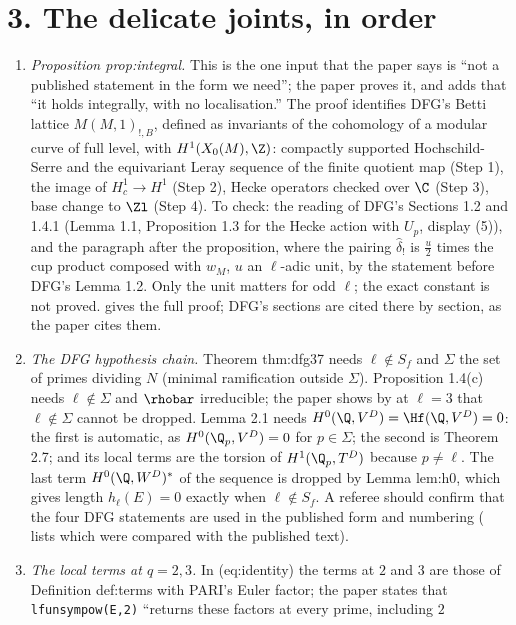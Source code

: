 \section*{3. The delicate joints, in order}

\begin{enumerate}[label=(\alph*), leftmargin=*]
\item \emph{Proposition prop:integral.} This is the one input that the paper says is ``not a published statement in the
form we need''; the paper proves it, and adds that ``it holds integrally, with no localisation.'' The proof identifies
DFG's Betti lattice $M(M,1)_{!,B}$, defined as invariants of the cohomology of a modular curve of full level, with
$H^1(X_0(M),\Z)$: compactly supported Hochschild-Serre and the equivariant Leray sequence of the finite quotient map (Step 1),
the image of $H^1_c\to H^1$ (Step 2), Hecke operators checked over $\C$ (Step 3), base change to $\Zl$ (Step 4). To check: the
reading of DFG's Sections 1.2 and 1.4.1 (Lemma 1.1, Proposition 1.3 for the Hecke action with $U_p$, display (5)), and the
paragraph after the proposition, where the pairing $\hat\delta_!$ is $\frac u2$ times the cup product composed with $w_{M}$,
$u$ an $\ell$-adic unit, by the statement before DFG's Lemma 1.2. Only the unit matters for odd $\ell$; the exact constant is
not proved.  gives the full proof; DFG's sections are cited there by section, as the paper cites them.
\item \emph{The DFG hypothesis chain.} Theorem thm:dfg37 needs $\ell\notin S_f$ and $\Sigma$ the set of primes dividing $N$
(minimal ramification outside $\Sigma$). Proposition 1.4(c) needs $\ell\notin\Sigma$ and $\rhobar$ irreducible; the paper
shows by  at $\ell=3$ that $\ell\notin\Sigma$ cannot be dropped. Lemma 2.1 needs $H^0(\Q,V^D)=\Hf(\Q,V^D)=0$:
the first is automatic, as $H^0(\Q_p,V^D)=0$ for $p\in\Sigma$; the second is Theorem 2.7; and its local terms are the torsion of
$H^1(\Q_p,T^D)$ because $p\ne\ell$. The last term $H^0(\Q,W^D)^*$ of the sequence is dropped by Lemma lem:h0, which gives
length $h_\ell(E)=0$ exactly when $\ell\notin S_f$. A referee should confirm that the four DFG statements are used in the
published form and numbering ( lists which were compared with the published text).
\item \emph{The local terms at $q=2,3$.} In (eq:identity) the terms at $2$ and $3$ are those of Definition def:terms with
PARI's Euler factor; the paper states that \texttt{lfunsympow(E,2)} ``returns these factors at every prime, including $2$

\end{enumerate}

